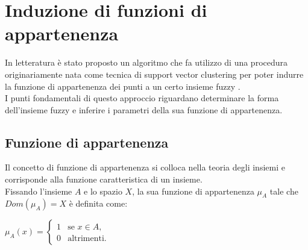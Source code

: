 \documentclass[12pt]{report}
\theoremstyle{definition}
\begin{document}
\section{Induzione di funzioni di appartenenza} \label{induzione}
In letteratura è stato proposto un algoritmo che fa utilizzo di una procedura originariamente nata come tecnica di support vector clustering per poter indurre la funzione di appartenenza dei punti a un certo insieme fuzzy \cite{1}.
\\
I punti fondamentali di questo approccio riguardano determinare la forma dell'insieme fuzzy e inferire i parametri della sua funzione di appartenenza.

\subsection{Funzione di appartenenza} \label{membership}
Il concetto di funzione di appartenenza si colloca nella teoria degli insiemi e corrisponde alla funzione caratteristica di un insieme.
\\
Fissando l'insieme $A$ e lo spazio $X$, la sua funzione di appartenenza $\mu_A$ tale che $Dom(\mu_A) = X$ è definita come:
\begin{center}
    $\mu_A(x)= \begin{cases} 1 & \mbox{se } x \in A, \\ 0 & \mbox{altrimenti.} \end{cases}$
\end{center}
\end{document}
